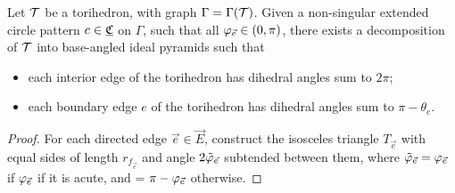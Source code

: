 \begin{lemma}
\label{l:circpattern_polyhedra}
Let ${\mathcal{T}}$ be a torihedron, with graph $\Gamma = \Gamma({\mathcal{T}})$.
Given a non-singular extended circle pattern $c \in {\underline{\mathfrak{C}}}$ on $\Gamma$,
such that all $\varphi_{\vec{e}} \in (0,\pi)$,
there exists a decomposition of ${\mathcal{T}}$
into base-angled ideal pyramids such that
	\begin{itemize}
		\item each interior edge of the torihedron has dihedral angles sum to $2\pi$;
		\item each boundary edge $e$ of the torihedron has dihedral angles sum to
			$\pi - \theta_e$.
	\end{itemize}
\end{lemma}

\begin{proof}
For each directed edge $\vec{e} \in \vec{E}$,
construct the isosceles triangle $T_{\vec{e}}$
with equal sides of length $r_{f_{\vec{e}}}$ and
angle $2\tilde{\varphi}_{\vec{e}}$ subtended between them,
where $\tilde{\varphi}_{\vec{e}} = \varphi_{\vec{e}}$
if $\varphi_{\vec{e}}$ if it is acute,
and = $\pi - \varphi_{\vec{e}}$ otherwise.


\end{proof}
